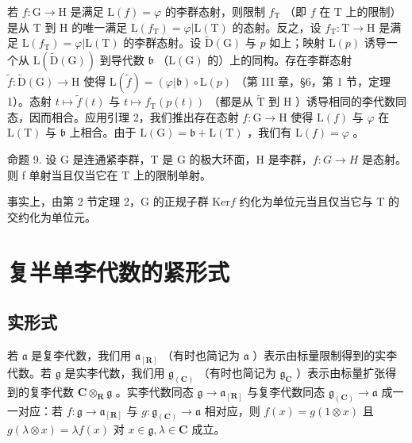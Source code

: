 若 \(f: \mathrm{G} \to \mathrm{H}\) 是满足 \(\mathrm{L}(f) = \varphi\) 的李群态射，则限制 \(f_{\mathrm{T}}\) （即 \(f\) 在 \(\mathrm{T}\) 上的限制）是从 \(\mathrm{T}\) 到 \(\mathrm{H}\) 的唯一满足 \(\mathrm{L}(f_{\mathrm{T}}) = \varphi | \mathrm{L}(\mathrm{T})\) 的态射。反之，设 \(f_{\mathrm{T}}: \mathrm{T} \to \mathrm{H}\) 是满足 \(\mathrm{L}(f_{\mathrm{T}}) = \varphi | \mathrm{L}(\mathrm{T})\) 的李群态射。设 \(\tilde{\mathrm{D}}(\mathrm{G})\) 与 \(p\) 如上；映射 \(\mathrm{L}(p)\) 诱导一个从 \(\mathrm{L}(\tilde{\mathrm{D}}(\mathrm{G}))\) 到导代数 \(\mathfrak{b}\) （\(\mathrm{L}(\mathrm{G})\) 的）上的同构。存在李群态射 \(\tilde{f}: \tilde{\mathrm{D}}(\mathrm{G}) \to \mathrm{H}\) 使得 \(\mathrm{L}(\tilde{f}) = (\varphi | \mathfrak{b}) \circ \mathrm{L}(p)\) （第 III 章，§6，第 1 节，定理 1）。态射 \(t \mapsto \tilde{f}(t)\) 与 \(t \mapsto f_{\mathrm{T}}(p(t))\) （都是从 \(\tilde{\mathrm{T}}\) 到 \(\mathrm{H}\) ）诱导相同的李代数同态，因而相合。应用引理 2，我们推出存在态射 \(f: \mathrm{G} \to \mathrm{H}\) 使得 \(\mathrm{L}(f)\) 与 \(\varphi\) 在 \(\mathrm{L}(\mathrm{T})\) 与 \(\mathfrak{b}\) 上相合。由于 \(\mathrm{L}(\mathrm{G}) = \mathfrak{b} + \mathrm{L}(\mathrm{T})\) ，我们有 \(\mathrm{L}(f) = \varphi\) 。

命题 9. 设 G 是连通紧李群，T 是 G 的极大环面，H 是李群，\(f: G \to H\) 是态射。则 f 单射当且仅当它在 T 上的限制单射。

事实上，由第 2 节定理 2，G 的正规子群 \(\mathrm{Ker}f\) 约化为单位元当且仅当它与 T 的交约化为单位元。

\section{复半单李代数的紧形式}

\subsection{实形式}

若 \(\mathfrak{a}\) 是复李代数，我们用 \(\mathfrak{a}_{[\mathbf{R} ]}\) （有时也简记为 \(\mathfrak{a}\) ）表示由标量限制得到的实李代数。若 \(\mathfrak{g}\) 是实李代数，我们用 \(\mathfrak{g}_{(\mathbf{C})}\) （有时也简记为 \(\mathfrak{g}_{\mathbf{C}}\) ）表示由标量扩张得到的复李代数 \(\mathbf{C}\otimes_{\mathbf{R}}\mathfrak{g}\) 。实李代数同态 \(\mathfrak{g}\to \mathfrak{a}_{[\mathbf{R}]}\) 与复李代数同态 \(\mathfrak{g}_{(\mathbf{C})}\to \mathfrak{a}\) 成一一对应：若 \(f:\mathfrak{g}\to \mathfrak{a}_{[\mathbf{R}]}\) 与 \(g:\mathfrak{g}_{(\mathbf{C})}\to \mathfrak{a}\) 相对应，则 \(f(x) = g(1\otimes x)\) 且 \(g(\lambda \otimes x) = \lambda f(x)\) 对 \(x\in \mathfrak{g},\lambda \in \mathbf{C}\) 成立。

